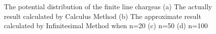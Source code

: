 \documentclass[journal,twocolumn,letterpaper]{IEEEJERM}
\begin{document}
\begin{figure}[H]   
	\centering	  
	    \label{11}\hfill	  
	\label{21}\\
	    \label{31}\hfill	  
	\label{41}\\
	\caption{The potential distribution of the finite line chargeas (a) The actually result calculated by Calculus Method (b) The approximate result calculated by Infinitesimal Method when n=20 (c) n=50 (d) n=100
	}	  
	\label{fig3} 
\end{figure}
\end{document}

